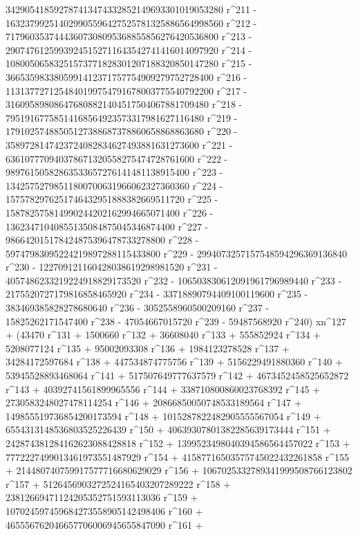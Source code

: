        342905418592787413474332852149693301019053280 r^211 - 
       163237992514029905596427525781325886564998560 r^212 - 
       71796035374443607308095368855856276420536800 r^213 - 
       29074761259939245152711643542741416014097920 r^214 - 
       10800506583251573771828301207188320850147280 r^215 - 
       3665359833805991412371757754909279752728400 r^216 - 
       1131377271254840199754791678003775540792200 r^217 - 
       316095898086476808821404517504067881709480 r^218 - 
       79519167758514168564923573317981627116480 r^219 - 
       17910257488505127388687378860658868863680 r^220 - 
       3589728147423724082834627493881631273600 r^221 - 
       636107770940378671320558275474728761600 r^222 - 
       98976150582863533657276141481138915400 r^223 - 
       13425752798511800700631966062327360360 r^224 - 
       1575782976251746432951888382669511720 r^225 - 
       158782575814990244202162994665071400 r^226 - 
       13623471040855135084875045346874400 r^227 - 
       986642015178424875396478733278800 r^228 - 
       59747983095224219897288115433800 r^229 - 
       2994073257157548594296369136840 r^230 - 
       122709121160428038619298981520 r^231 - 
       4057486233219224918829173520 r^232 - 
       106503830612091961796989440 r^233 - 
       2175520727179816858465920 r^234 - 
       33718890794409100119600 r^235 - 383469385828278680640 r^236 - 
       3052558960500209160 r^237 - 15825262171547400 r^238 - 
       47054667015720 r^239 - 
       59487568920 r^240) xn^127 + (43470 r^131 + 1500660 r^132 + 
       36608040 r^133 + 555852924 r^134 + 5208077124 r^135 + 
       95002093308 r^136 + 1984123278528 r^137 + 
       34284172597684 r^138 + 447534874775756 r^139 + 
       5156229491880360 r^140 + 53945528893468064 r^141 + 
       517507649777637579 r^142 + 4673452458525652872 r^143 + 
       40392741561899965556 r^144 + 338710800860023768392 r^145 + 
       2730583248027478114254 r^146 + 20866850050748533189564 r^147 + 
       149855519736854200173594 r^148 + 
       1015287822482905555567054 r^149 + 
       6554313148536803525226439 r^150 + 
       40639307801382285639173444 r^151 + 
       242874381284162623088428818 r^152 + 
       1399523498040394586564457022 r^153 + 
       7772227499013461973551487929 r^154 + 
       41587716503575745022432261858 r^155 + 
       214480740759917577716680629029 r^156 + 
       1067025332789341999508766123802 r^157 + 
       5126456903272524165403207289222 r^158 + 
       23812669471124205352751593113036 r^159 + 
       107024597459684273558905142498406 r^160 + 
       465556762046657706006945655847090 r^161 + 
